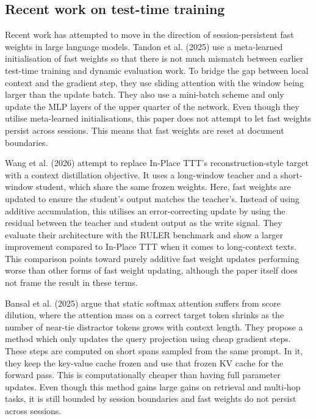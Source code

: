 \documentclass[12pt,a4paper]{article}
\begin{document}
\subsection*{Recent work on test-time training}

Recent work has attempted to move in the direction of session-persistent fast weights in large language models. Tandon et al. (2025) use a meta-learned initialisation of fast weights so that there is not much mismatch between earlier test-time training and dynamic evaluation work. To bridge the gap between local context and the gradient step, they use sliding attention with the window being larger than the update batch. They also use a mini-batch scheme and only update the MLP layers of the upper quarter of the network. Even though they utilise meta-learned initialisations, this paper does not attempt to let fast weights persist across sessions. This means that fast weights are reset at document boundaries.

Wang et al. (2026) attempt to replace In-Place TTT's reconstruction-style target with a context distillation objective. It uses a long-window teacher and a short-window student, which share the same frozen weights. Here, fast weights are updated to ensure the student's output matches the teacher's. Instead of using additive accumulation, this utilises an error-correcting update by using the residual between the teacher and student output as the write signal. They evaluate their architecture with the RULER benchmark and show a larger improvement compared to In-Place TTT when it comes to long-context texts. This comparison points toward purely additive fast weight updates performing worse than other forms of fast weight updating, although the paper itself does not frame the result in these terms.

Bansal et al. (2025) argue that static softmax attention suffers from score dilution, where the attention mass on a correct target token shrinks as the number of near-tie distractor tokens grows with context length. They propose a method which only updates the query projection using cheap gradient steps. These steps are computed on short spans sampled from the same prompt. In it, they keep the key-value cache frozen and use that frozen KV cache for the forward pass. This is computationally cheaper than having full parameter updates. Even though this method gains large gains on retrieval and multi-hop tasks, it is still bounded by session boundaries and fast weights do not persist across sessions.
\end{document}
